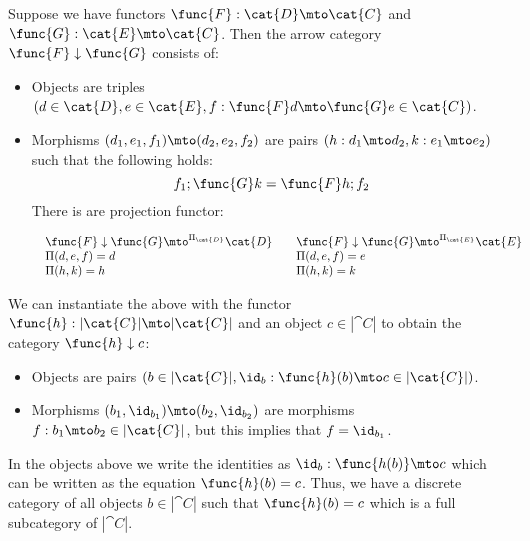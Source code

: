 \begin{definition}
\label{def:comma_category}
Suppose we have functors $\func{F} : \cat{D} \mto \cat{C}$ and
$\func{G} : \cat{E} \mto \cat{C}$.  Then the arrow category 
$\func{F} \downarrow \func{G}$ consists of:
\begin{itemize}
\item Objects are triples 
      $(d \in \cat{D}, e \in \cat{E}, 
        f : \func{F}d \mto \func{G}e \in \cat{C})$.
\item Morphisms $(d_1,e_1,f_1) \mto (d_2,e_2,f_2)$ are pairs 
      $(h : d_1 \mto d_2,k : e_1 \mto e_2)$ such that the following holds:
      \[
           f_1;\func{G}k = \func{F}h;f_2
      \]
      There is are projection functor:
      \begin{center}
        \begin{math}
            \begin{array}{lll}
                \begin{array}{lll}
                    \func{F} \downarrow \func{G} \mto^{\Pi_{\cat{D}}} \cat{D}\\
                    \Pi(d,e,f) = d\\
                    \Pi(h,k) = h
               \end{array}
               &
               \begin{array}{lll}
                    \func{F} \downarrow \func{G} \mto^{\Pi_{\cat{E}}} \cat{E}\\
                    \Pi(d,e,f) = e\\
                    \Pi(h,k) = k
               \end{array}
            \end{array}
        \end{math}
    \end{center}
\end{itemize}
\end{definition}
\noindent
We can instantiate the above with the functor $\func{h} : |\cat{C}|
\mto |\cat{C}|$ and an object $c \in |\cat{C}|$ to obtain the
category $\func{h} \downarrow c$:
\begin{itemize}
\item Objects are pairs $(b \in |\cat{C}|, \id_{b} : \func{h}(b)
\mto c \in |\cat{C}|)$.

\item Morphisms $(b_1,\id_{b_1}) \mto (b_2,\id_{b_2})$ are morphisms
$f : b_1 \mto b_2 \in |\cat{C}|$, but this implies that $f = \id_{b_1}$.
\end{itemize}
In the objects above we write the identities as $\id_{b} :
\func{h(b)} \mto c$ which can be written as the equation
$\func{h}(b) = c$. Thus, we have a discrete category of all objects $b
\in |\cat{C}|$ such that $\func{h}(b) = c$ which is a full subcategory
of $|\cat{C}|$.

